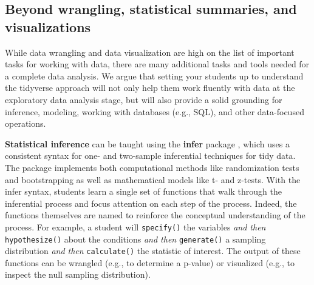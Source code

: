 \documentclass[12pt]{article}
\begin{document}
\hypertarget{sec:extra}{%
\subsection{Beyond wrangling, statistical summaries, and
visualizations}\label{sec:extra}}

While data wrangling and data visualization are high on the list of
important tasks for working with data, there are many additional tasks
and tools needed for a complete data analysis. We argue that setting
your students up to understand the tidyverse approach will not only help
them work fluently with data at the exploratory data analysis stage, but
will also provide a solid grounding for inference, modeling, working
with databases (e.g., SQL), and other data-focused operations.

\textbf{Statistical inference} can be taught using the \textbf{infer}
package \citep{R-infer}, which uses a consistent syntax for one- and
two-sample inferential techniques for tidy data. The package implements
both computational methods like randomization tests and bootstrapping as
well as mathematical models like t- and z-tests. With the infer syntax,
students learn a single set of functions that walk through the
inferential process and focus attention on each step of the process.
Indeed, the functions themselves are named to reinforce the conceptual
understanding of the process. For example, a student will
\texttt{specify()} the variables \emph{and then} \texttt{hypothesize()}
about the conditions \emph{and then} \texttt{generate()} a sampling
distribution \emph{and then} \texttt{calculate()} the statistic of
interest. The output of these functions can be wrangled (e.g., to
determine a p-value) or visualized (e.g., to inspect the null sampling
distribution).
\end{document}
